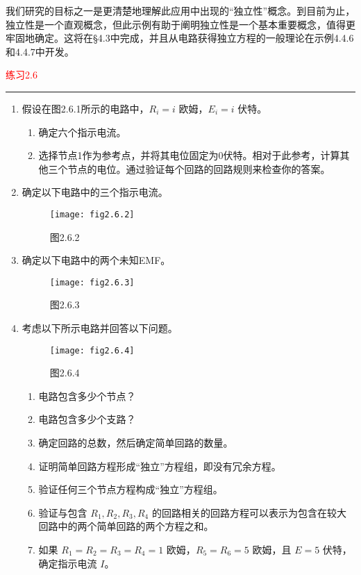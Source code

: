 我们研究的目标之一是更清楚地理解此应用中出现的“独立性”概念。到目前为止，独立性是一个直观概念，但此示例有助于阐明独立性是一个基本重要概念，值得更牢固地确定。这将在§4.3中完成，并且从电路获得独立方程的一般理论在示例4.4.6和4.4.7中开发。

\textcolor{red}{练习2.6}
\color{red}\rule{\textwidth}{0.4pt}\color{black}

\begin{enumerate}[leftmargin=*, label=\bfseries 2.6.\arabic*]
    \item 假设在图2.6.1所示的电路中，\(R_i = i\) 欧姆，\(E_i = i\) 伏特。
    \begin{enumerate}[label=(\alph*)]
        \item 确定六个指示电流。
        \item 选择节点1作为参考点，并将其电位固定为0伏特。相对于此参考，计算其他三个节点的电位。通过验证每个回路的回路规则来检查你的答案。
    \end{enumerate}

    \item 确定以下电路中的三个指示电流。
    \begin{figure}[h]
        \centering
        \texttt{[image: fig2.6.2]} 
        \caption{图2.6.2}
        \label{fig:2.6.2}
    \end{figure}

    \item 确定以下电路中的两个未知EMF。
    \begin{figure}[h]
        \centering
        \texttt{[image: fig2.6.3]} 
        \caption{图2.6.3}
        \label{fig:2.6.3}
    \end{figure}

    \item 考虑以下所示电路并回答以下问题。
    \begin{figure}[h]
        \centering
        \texttt{[image: fig2.6.4]} 
        \caption{图2.6.4}
        \label{fig:2.6.4}
    \end{figure}
    \begin{enumerate}[label=(\alph*)]
        \item 电路包含多少个节点？
        \item 电路包含多少个支路？
        \item 确定回路的总数，然后确定简单回路的数量。
        \item 证明简单回路方程形成“独立”方程组，即没有冗余方程。
        \item 验证任何三个节点方程构成“独立”方程组。
        \item 验证与包含 \(R_1, R_2, R_3, R_4\) 的回路相关的回路方程可以表示为包含在较大回路中的两个简单回路的两个方程之和。
        \item 如果 \(R_1 = R_2 = R_3 = R_4 = 1\) 欧姆，\(R_5 = R_6 = 5\) 欧姆，且 \(E = 5\) 伏特，确定指示电流 \(I\)。
    \end{enumerate}
\end{enumerate}

